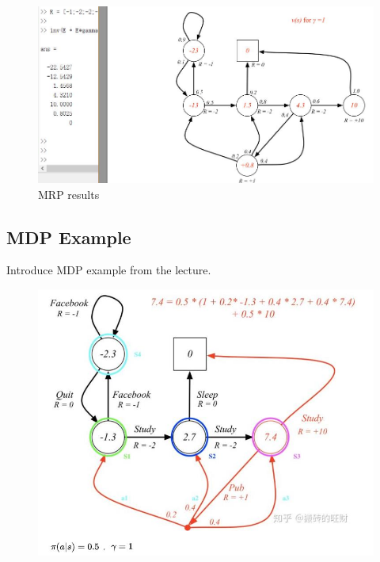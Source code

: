 \documentclass[10pt, a4paper, twocolumn]{article} %
\begin{document}
\begin{figure}[H]
	\begin{centering}
		\includegraphics[width = \linewidth]{MRPexp.jpg}
	\end{centering}
	\caption{MRP results}
	\label{fig:MRPres}
\end{figure}

\subsection{MDP Example}
Introduce MDP example from the lecture.

\begin{figure}[H]
	\begin{centering}
		\includegraphics[width = \linewidth]{MDPexp.jpg}
	\end{centering}
\end{figure}
\end{document}
